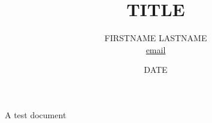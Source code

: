 \documentclass{article}
\title{TITLE}
\author{FIRSTNAME LASTNAME \\ \href{example@test.com}{email}}
\date{DATE}
\begin{document}
\begin{titlepage}

    \maketitle

\end{titlepage}

A test document
\end{document}
